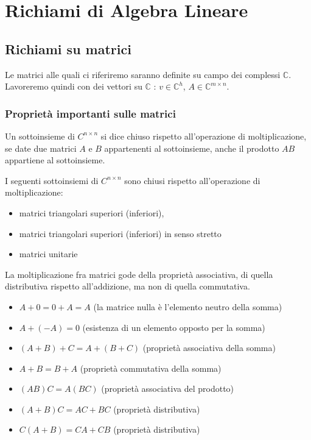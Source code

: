 

\inbpdocument 

\chapter{Richiami di Algebra Lineare}

\section{Richiami su matrici}
Le matrici alle quali ci riferiremo saranno definite su campo dei complessi
 $\mathbb{C}$.\\
Lavoreremo quindi con dei vettori su
$\mathbb{C}$ : $v \in \mathbb{C}^h$, $A \in \mathbb{C}^{m \times n}$.

\subsection{Proprietà importanti sulle matrici}
\begin{defn}
Un sottoinsieme di $C^{n\times n}$ si dice chiuso rispetto
all'operazione di moltiplicazione, se date due matrici $A$ e $B$ 
appartenenti al sottoinsieme, anche il
prodotto $AB$ appartiene al sottoinsieme. 
\end{defn}
I seguenti sottoinsiemi di
 $C^{n\times n}$ sono chiusi rispetto all'operazione di moltiplicazione:
\begin{itemize}
 \item matrici triangolari superiori (inferiori),
 \item matrici triangolari superiori (inferiori) in senso stretto
 \item matrici unitarie
\end{itemize} 
La moltiplicazione fra matrici gode della proprietà associativa, di quella
distributiva rispetto all’addizione, ma non di quella commutativa.

\begin{property}
  \begin{itemize}
  \item  $A+ 0 = 0 + A = A$  (la matrice nulla \`e l'elemento neutro 
     della somma)
\item $ A+(-A) = 0$ (esistenza di un elemento opposto per la somma)
\item$ (A+ B) + C = A + (B+C)$ (propriet\`a associativa della somma)
\item $  A + B = B + A$   (propriet\`a commutativa della somma)
\item  $(AB)C = A(BC)$   (propriet\`a associativa del prodotto)
\item $ (A+B)C = AC + BC $ (propriet\`a distributiva)
\item $C(A+B) = CA + CB $  (propriet\`a distributiva)
 \end{itemize}
\end{property}

